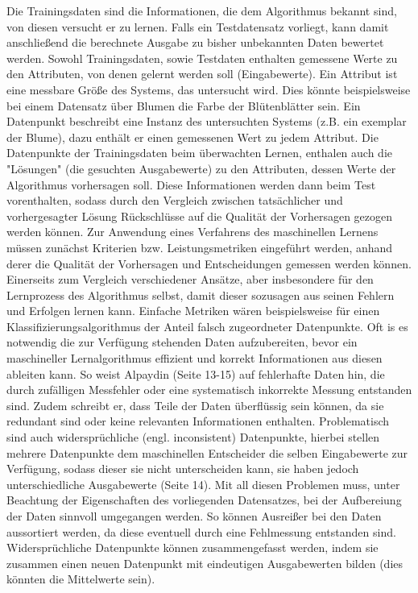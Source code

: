 \documentclass[
	12pt,
	a4paper,
	BCOR10mm,
	DIV14,
	listof=totoc,
	bibliography=totoc,
	headsepline
]{scrreprt}
\begin{document}
Die Trainingsdaten sind die Informationen, die dem Algorithmus bekannt sind, von diesen versucht er zu lernen. Falls ein Testdatensatz vorliegt, kann damit anschließend die berechnete Ausgabe zu bisher unbekannten Daten bewertet werden. Sowohl Trainingsdaten, sowie Testdaten enthalten gemessene Werte zu den Attributen, von denen gelernt werden soll (Eingabewerte). Ein Attribut ist eine messbare Größe des Systems, das untersucht wird. Dies könnte beispielsweise bei einem Datensatz über Blumen die Farbe der Blütenblätter sein. Ein Datenpunkt beschreibt eine Instanz des untersuchten Systems (z.B. ein exemplar der Blume), dazu enthält er einen gemessenen Wert zu jedem Attribut. Die Datenpunkte der Trainingsdaten beim überwachten Lernen, enthalen auch die "Lösungen" (die gesuchten Ausgabewerte) zu den Attributen, dessen Werte der Algorithmus vorhersagen soll. Diese Informationen werden dann beim Test vorenthalten, sodass durch den Vergleich zwischen tatsächlicher und vorhergesagter Lösung Rückschlüsse auf die Qualität der Vorhersagen gezogen werden können.
Zur Anwendung eines Verfahrens des maschinellen Lernens müssen zunächst Kriterien bzw. Leistungsmetriken eingeführt werden, anhand derer die Qualität der Vorhersagen und Entscheidungen gemessen werden können. Einerseits zum Vergleich verschiedener Ansätze, aber insbesondere für den Lernprozess des Algorithmus selbst, damit dieser sozusagen aus seinen Fehlern und Erfolgen lernen kann. Einfache Metriken wären beispielsweise für einen Klassifizierungsalgorithmus der Anteil falsch zugeordneter Datenpunkte.
Oft is es notwendig die zur Verfügung stehenden Daten aufzubereiten, bevor ein maschineller Lernalgorithmus effizient und korrekt Informationen aus diesen ableiten kann. So weist Alpaydin \cite{Alpaydin:2010:IML:1734076} (Seite 13-15) auf fehlerhafte Daten hin, die durch zufälligen Messfehler oder eine systematisch inkorrekte Messung entstanden sind. Zudem schreibt er, dass Teile der Daten überflüssig sein können, da sie redundant sind oder keine relevanten Informationen enthalten. Problematisch sind auch widersprüchliche (engl. inconsistent) Datenpunkte, hierbei stellen mehrere Datenpunkte dem maschinellen Entscheider die selben Eingabewerte zur Verfügung, sodass dieser sie nicht unterscheiden kann, sie haben jedoch unterschiedliche Ausgabewerte \cite{Alpaydin:2010:IML:1734076} (Seite 14). Mit all diesen Problemen muss, unter Beachtung der Eigenschaften des vorliegenden Datensatzes, bei der Aufbereiung der Daten sinnvoll umgegangen werden. So können Ausreißer bei den Daten aussortiert werden, da diese eventuell durch eine Fehlmessung entstanden sind. Widersprüchliche Datenpunkte können zusammengefasst werden, indem sie zusammen einen neuen Datenpunkt mit eindeutigen Ausgabewerten bilden (dies könnten die Mittelwerte sein). \\
\end{document}
